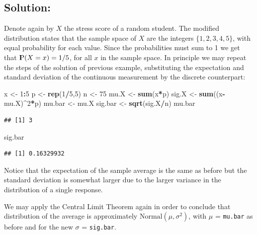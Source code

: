\documentclass[]{krantz}
\makeatletter
\newenvironment{Shaded}{\begin{snugshade}}{\end{snugshade}}
\newcommand{\KeywordTok}[1]{\textcolor[rgb]{0.13,0.29,0.53}{\textbf{#1}}}
\newcommand{\DecValTok}[1]{\textcolor[rgb]{0.00,0.00,0.81}{#1}}
\newcommand{\StringTok}[1]{\textcolor[rgb]{0.31,0.60,0.02}{#1}}
\newcommand{\OperatorTok}[1]{\textcolor[rgb]{0.81,0.36,0.00}{\textbf{#1}}}
\newcommand{\NormalTok}[1]{#1}
\newcommand{\Prob}{{\rm I\kern-.3em P}}
\newenvironment{kframe}{%
\medskip{}
\setlength{\fboxsep}{.8em}
 \def\at@end@of@kframe{}%
 \ifinner\ifhmode%
  \def\at@end@of@kframe{\end{minipage}}%
  \begin{minipage}{\columnwidth}%
 \fi\fi%
 \def\FrameCommand##1{\hskip\@totalleftmargin \hskip-\fboxsep
 \colorbox{shadecolor}{##1}\hskip-\fboxsep
     \hskip-\linewidth \hskip-\@totalleftmargin \hskip\columnwidth}%
 \MakeFramed {\advance\hsize-\width
   \@totalleftmargin\z@ \linewidth\hsize
   \@setminipage}}%
 {\par\unskip\endMakeFramed%
 \at@end@of@kframe}
\renewenvironment{Shaded}{\begin{kframe}}{\end{kframe}}
\theoremstyle{definition}
\theoremstyle{definition}
\theoremstyle{definition}
\theoremstyle{remark}
\makeatother
\begin{document}
\subsection*{Solution:}\label{solution-1}


Denote again by \(X\) the stress score of a random student. The modified
distribution states that the sample space of \(X\) are the integers
\(\{1, 2, 3, 4, 5\}\), with equal probability for each value. Since the
probabilities must sum to 1 we get that \(\Prob(X = x) = 1/5\), for all
\(x\) in the sample space. In principle we may repeat the steps of the
solution of previous example, substituting the expectation and standard
deviation of the continuous measurement by the discrete counterpart:

\begin{Shaded}
\begin{Highlighting}[]
\NormalTok{x <-}\StringTok{ }\DecValTok{1}\OperatorTok{:}\DecValTok{5}
\NormalTok{p <-}\StringTok{ }\KeywordTok{rep}\NormalTok{(}\DecValTok{1}\OperatorTok{/}\DecValTok{5}\NormalTok{,}\DecValTok{5}\NormalTok{)}
\NormalTok{n <-}\StringTok{ }\DecValTok{75}
\NormalTok{mu.X <-}\StringTok{ }\KeywordTok{sum}\NormalTok{(x}\OperatorTok{*}\NormalTok{p)}
\NormalTok{sig.X <-}\StringTok{ }\KeywordTok{sum}\NormalTok{((x}\OperatorTok{-}\NormalTok{mu.X)}\OperatorTok{^}\DecValTok{2}\OperatorTok{*}\NormalTok{p)}
\NormalTok{mu.bar <-}\StringTok{ }\NormalTok{mu.X}
\NormalTok{sig.bar <-}\StringTok{ }\KeywordTok{sqrt}\NormalTok{(sig.X}\OperatorTok{/}\NormalTok{n)}
\NormalTok{mu.bar}
\end{Highlighting}
\end{Shaded}

\begin{verbatim}
## [1] 3
\end{verbatim}

\begin{Shaded}
\begin{Highlighting}[]
\NormalTok{sig.bar}
\end{Highlighting}
\end{Shaded}

\begin{verbatim}
## [1] 0.16329932
\end{verbatim}

Notice that the expectation of the sample average is the same as before
but the standard deviation is somewhat larger due to the larger variance
in the distribution of a single response.

We may apply the Central Limit Theorem again in order to conclude that
distribution of the average is approximately
\(\mathrm{Normal}(\mu, \sigma^2)\), with \(\mu\) = \texttt{mu.bar} as
before and for the new \(\sigma\) = \texttt{sig.bar}.
\end{document}
